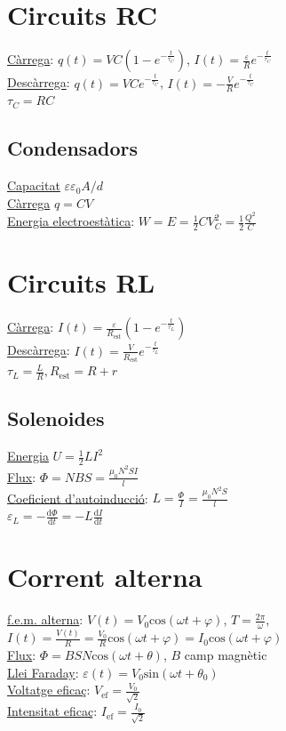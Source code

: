 \documentclass[12pt]{article}
\begin{document}
\begin{multicols}{4}
\section{Circuits RC}

\underline{Càrrega}: $q(t) = VC\left( 1 - e^{-\frac{t}{\tau_C}}\right)$, $I(t) = \frac{\varepsilon}{R} e^{-\frac{t}{\tau_C}}$ \\
\underline{Descàrrega}: $q(t) = VCe^{-\frac{t}{\tau_C}}$, $I(t) = -\frac{V}{R}e^{-\frac{t}{\tau_C}}$ \\

$\tau_C = RC$
\subsection{Condensadors}

\underline{Capacitat} $\varepsilon \varepsilon_0 A / d$ \\
\underline{Càrrega} $q = CV$ \\
\underline{Energia electroestàtica}: $W = E = \frac{1}{2}CV_C^2 = \frac{1}{2}\frac{Q^2}{C}$

\section{Circuits RL}
\underline{Càrrega}: $I(t) = \frac{\varepsilon}{R_{\text{est}}} \left(1 - e^{-\frac{t}{\tau_L}}\right)$ \\
\underline{Descàrrega}: $I(t) = \frac{V}{R_{\text{est}}}e^{-\frac{t}{\tau_L}}$ \\
$\tau_L = \frac{L}{R}, R_{\text{est}} = R + r$

\subsection{Solenoides}

\underline{Energia} $U = \frac{1}{2} L I^2$ \\ 
\underline{Flux}: $\Phi = NBS = \frac{\mu_0 N^2SI}{l}$ \\
\underline{Coeficient d'autoinducció}: $L = \frac{\Phi}{I} = \frac{\mu_0N^2S}{l}$ \\
$\varepsilon_L= -\frac{\text{d}\Phi}{\text{d}t} = -L \frac{\text{d}I}{\text{d}t}$

\section{Corrent alterna}

\underline{f.e.m. alterna}: $V(t) = V_0\text{cos}(\omega t+\varphi)$, $T = \frac{2\pi}{\omega}$, $I(t) = \frac{V(t)}{R} = \frac{V_0}{R}\text{cos}(\omega t + \varphi) = I_0\text{cos}(\omega t + \varphi)$ \\
\underline{Flux}: $\Phi = BSN\text{cos}(\omega t+\theta)$, $B$ camp magnètic \\
\underline{Llei Faraday}: $\varepsilon(t) = V_0\text{sin}(\omega t + \theta_0)$ \\
\underline{Voltatge eficaç}: $V_{\text{ef}} = \frac{V_0}{\sqrt{2}}$ \\
\underline{Intensitat eficaç}: $I_{\text{ef}} = \frac{I_0}{\sqrt{2}}$


\end{multicols}
\end{document}
